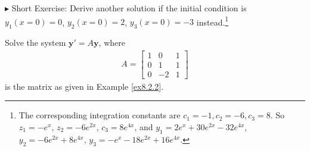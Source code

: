 $\blacktriangleright$ Short Exercise: Derive another solution if the initial condition is $y_1(x=0) = 0$, $y_2(x=0) = 2$, $y_3(x=0) = -3$ instead.\footnote{The corresponding integration constants are $c_1 = -1, c_2 = -6, c_3 = 8$. So $z_1 = -e^x$, $z_2 = -6e^{2x}$, $c_3 = 8e^{4x}$, and $y_1 = 2e^x + 30e^{2x} - 32e^{4x}$, $y_2 = -6e^{2x} + 8e^{4x}$, $y_3 = -e^x - 18e^{2x} + 16e^{4x}$.}

\begin{exmp}
\label{exmp:solveODEsystemcomplex}
Solve the system $\textbf{y}' = A\textbf{y}$, where
\begin{align*}
A = 
\begin{bmatrix}
1 & 0 & 1 \\
0 & 1 & 1 \\
0 & -2 & 1
\end{bmatrix}   
\end{align*}
is the matrix as given in Example \ref{ex8.2.2}.
\end{exmp}
